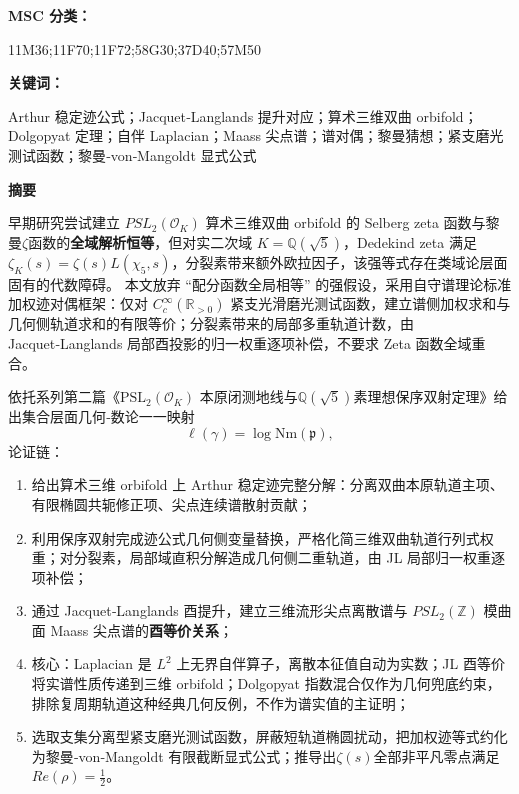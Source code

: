\documentclass[11pt,a4paper]{ctexart}
\begin{document}
\textbf{MSC 分类：}

11M36;11F70;11F72;58G30;37D40;57M50

\textbf{关键词：}

Arthur 稳定迹公式；Jacquet‑Langlands 提升对应；算术三维双曲
orbifold；Dolgopyat 定理；自伴 Laplacian；Maass
尖点谱；谱对偶；黎曼猜想；紧支磨光测试函数；黎曼‑von‑Mangoldt 显式公式

\textbf{摘要}

早期研究尝试建立 \({PSL}_{2}\left( \mathcal{O}_{K} \right)\)
算术三维双曲 orbifold 的 Selberg zeta
函数与黎曼\(\zeta\)函数的\textbf{全域解析恒等}，但对实二次域
\(K = \mathbb{Q}\left( \sqrt{5} \right)\)，Dedekind zeta 满足
\(\zeta_{K}(s) = \zeta(s)L\left( \chi_{5},s \right)\)，分裂素带来额外欧拉因子，该强等式存在类域论层面固有的代数障碍。
本文放弃 ``配分函数全局相等''
的强假设，采用自守谱理论标准加权迹对偶框架：仅对
\(C_{c}^{\infty}\left( \mathbb{R}_{> 0} \right)\)
紧支光滑磨光测试函数，建立谱侧加权求和与几何侧轨道求和的有限等价；分裂素带来的局部多重轨道计数，由
Jacquet‑Langlands 局部酉投影的归一权重逐项补偿，不要求 Zeta
函数全域重合。

依托系列第二篇《$\mathrm{PSL}_{2}\left(\mathcal{O}_{K}\right)$ 本原闭测地线与$\mathbb{Q}\left(\sqrt{5}\right)$素理想保序双射定理》给出集合层面几何‑数论一一映射
\[
\ell\left(\gamma\right)=\log\mathrm{Nm}\left(\mathfrak{p}\right),
\]
论证链：


\begin{enumerate}
\def\labelenumi{\arabic{enumi}.}
\item
  给出算术三维 orbifold 上 Arthur
  稳定迹完整分解：分离双曲本原轨道主项、有限椭圆共轭修正项、尖点连续谱散射贡献；
\item
  利用保序双射完成迹公式几何侧变量替换，严格化简三维双曲轨道行列式权重；对分裂素，局部域直积分解造成几何侧二重轨道，由
  JL 局部归一权重逐项补偿；
\item
  通过 Jacquet‑Langlands 酉提升，建立三维流形尖点离散谱与
  \({PSL}_{2}\left( \mathbb{Z} \right)\) 模曲面 Maass
  尖点谱的\textbf{酉等价关系}；
\item
  核心：Laplacian 是 \(L^{2}\) 上无界自伴算子，离散本征值自动为实数；JL
  酉等价将实谱性质传递到三维 orbifold；Dolgopyat
  指数混合仅作为几何兜底约束，排除复周期轨道这种经典几何反例，不作为谱实值的主证明；
\item
  选取支集分离型紧支磨光测试函数，屏蔽短轨道椭圆扰动，把加权迹等式约化为黎曼‑von‑Mangoldt
  有限截断显式公式；推导出\(\zeta(s)\)全部非平凡零点满足
  \(Re(\rho) = \frac{1}{2}\)。
\end{enumerate}
\end{document}

